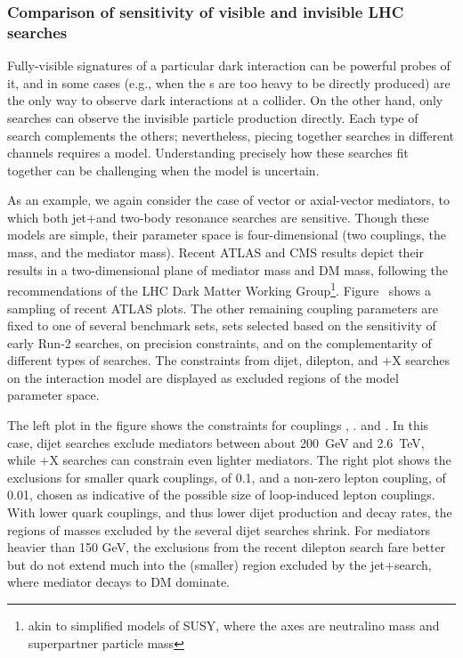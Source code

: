 \subsubsection{Comparison of sensitivity of visible and invisible LHC searches}
\label{sub:comparisonVisibleInvisible}

Fully-visible signatures of a particular dark interaction can be powerful probes of it, and in some cases (e.g., when the {\IP}s are too heavy to be directly produced) are the only way to observe dark interactions at a collider. On the other hand, only \MET searches can observe the invisible particle production directly.
Each type of search complements the others; nevertheless, piecing together searches in different channels requires a model. Understanding precisely how these searches fit together can be challenging when the model is uncertain.

As an example, we again consider the case of vector or axial-vector mediators, to which both jet+\MET and two-body resonance searches are sensitive.
Though these models are simple, their parameter space is four-dimensional (two couplings, the \IP mass, and the mediator mass).
Recent ATLAS and CMS results depict their results in a two-dimensional plane of mediator mass and DM mass, following the recommendations of the LHC Dark Matter Working Group\footnote{akin to simplified models of SUSY, where the axes are neutralino mass and superpartner particle mass}.
Figure~\label{fig:sensitivityComparison} shows a sampling of recent ATLAS plots.
The other remaining coupling parameters are fixed to one of several benchmark sets, sets selected based on the sensitivity of early Run-2 searches, on precision constraints, and on the complementarity of different types of searches.
The constraints from dijet, dilepton, and \MET+X searches on the interaction model are displayed as excluded regions of the model parameter space.

The left plot in the figure shows the constraints for couplings , . and .
In this case, dijet searches exclude mediators between about 200~GeV and 2.6~TeV, while \MET+X searches can constrain even lighter mediators.
The right plot shows the exclusions for smaller quark couplings, \gq of 0.1, and a non-zero lepton coupling, \gl of 0.01, chosen as indicative of the possible size of loop-induced lepton couplings.
With lower quark couplings, and thus lower dijet production and decay rates, the regions of masses excluded by the several dijet searches shrink.
For mediators heavier than 150 GeV, the exclusions from the recent dilepton search fare better but do not extend much into the (smaller) region excluded by the jet+\MET search, where mediator decays to DM dominate.

